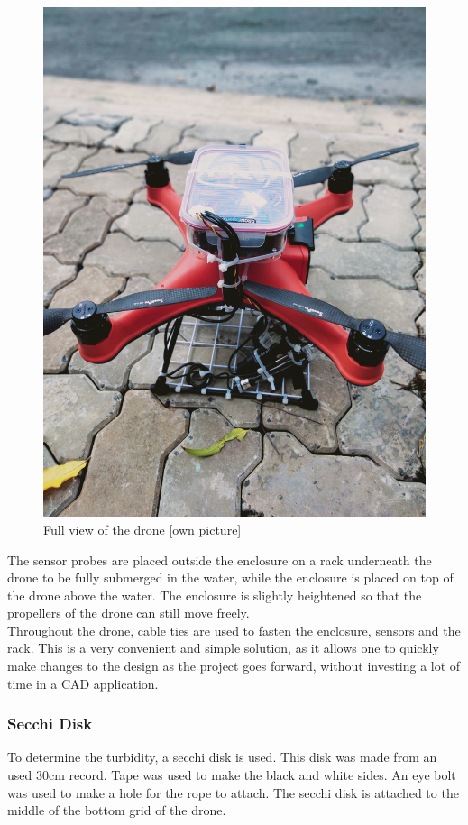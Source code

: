 \begin{figure}[h]
\begin{minipage}[b]{0.5\textwidth}
    \includegraphics[width=\textwidth]{070_design/package/53_mount.jpg}
    \caption{Full view of the drone [own picture]}
  \end{minipage}
\end{figure}

The sensor probes are placed outside the enclosure on a rack underneath the drone to be fully submerged in the water, while the enclosure is placed on top of the drone above the water. The enclosure is slightly heightened so that the propellers of the drone can still move freely.\\

Throughout the drone, cable ties are used to fasten the enclosure, sensors and the rack. This is a very convenient and simple solution, as it allows one to quickly make changes to the design as the project goes forward, without investing a lot of time in a \gls{CAD} application. 

\newpage
\subsubsection{Secchi Disk}
To determine the turbidity, a secchi disk is used. This disk was made from an used 30\gls{cm} record. Tape was used to make the black and white sides. An eye bolt was used to make a hole for the rope to attach. The secchi disk is attached to the middle of the bottom grid of the drone.

